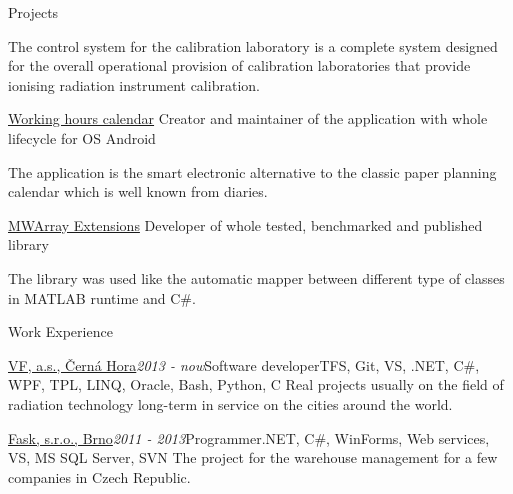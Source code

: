 \documentclass{cv} %
\begin{document}
\begin{rSection}{Projects}
\begin{rSubsection}
The control system for the calibration laboratory is a complete system designed for the overall operational provision of calibration laboratories that provide ionising radiation instrument calibration.
\end{rSubsection}

\begin{rSubsection}
{\href{https://play.google.com/store/apps/details?id=eu.jksoft.planningcalendar}{Working hours calendar}}{}
{Creator and maintainer of the application with whole lifecycle for OS Android}{}

The application is the smart electronic alternative to the classic paper planning calendar which is well known from diaries.
\end{rSubsection}

\begin{rSubsection}
{\href{http://honzakuzel.eu/mwarrayextensions.html}{MWArray Extensions}}{}
{Developer of whole tested, benchmarked and published library}{}

The library was used like the automatic mapper between different type of classes in MATLAB runtime and C\#.
\end{rSubsection}

\end{rSection}


\begin{rSection}{Work Experience}

\begin{rSubsection}{\href{https://www.vfnuclear.com/en/}{VF, a.s., \v Cern\' a Hora}}{\em 2013 - now}{Software developer}{TFS, Git, VS, .NET, C\#, WPF, TPL, LINQ, Oracle, Bash, Python, C}
Real projects usually on the field of radiation technology long-term in service on the cities around the world.
\end{rSubsection}

\begin{rSubsection}{\href{http://www.fask.cz/}{Fask, s.r.o., Brno}}{\em 2011 - 2013}{Programmer}{.NET, C\#, WinForms, Web services, VS, MS SQL Server, SVN}
The project for the warehouse management for a few companies in Czech Republic.
\end{rSubsection}

\end{rSection}
\end{document}
